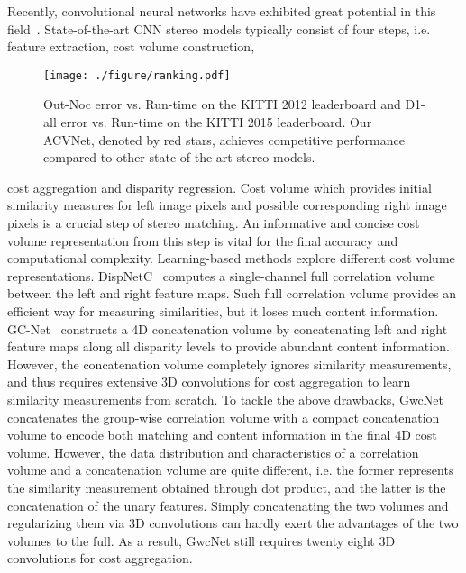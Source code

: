 \documentclass[10pt,twocolumn,letterpaper]{article}
\begin{document}
Recently, convolutional neural networks have exhibited great potential in this field~\cite{dispNetC2016large, chang2018pyramid, guo2019group, xu2020aanet}. State-of-the-art CNN stereo models typically consist of four steps, i.e. feature extraction, cost volume construction, 
\begin{figure}[t]
\centering
{\texttt{[image: ./figure/ranking.pdf]}}
\vspace{-15pt}
\caption{
Out-Noc error vs. Run-time on the KITTI 2012 leaderboard and D1-all error vs. Run-time on the KITTI 2015 leaderboard. Our ACVNet, denoted by red stars, achieves competitive performance compared to other 
state-of-the-art stereo models.}\label{fig:ranking}
\vspace{-15pt}
\end{figure}
cost aggregation and disparity regression. Cost volume which provides initial similarity measures for left image pixels and possible corresponding right image pixels is a crucial step of stereo matching. An informative and concise cost volume representation from this step is vital for the final accuracy and computational complexity. Learning-based methods explore different cost volume representations. 
DispNetC~\cite{dispNetC2016large} computes a single-channel full correlation volume between the left and right feature maps. Such full correlation volume provides an efficient way for measuring similarities, but it loses much content information.
GC-Net~\cite{kendall2017end}
constructs a 4D concatenation volume by concatenating left and right feature maps along all disparity levels to provide abundant content information. However, the concatenation volume completely ignores similarity measurements, and thus requires extensive 3D convolutions for cost aggregation to learn similarity measurements from scratch. To tackle the above drawbacks, 
GwcNet~\cite{guo2019group} concatenates the group-wise correlation volume with a compact concatenation volume to encode both matching and content information in the final 4D cost volume. However, the data distribution and characteristics of a correlation volume and a concatenation volume are quite different, i.e. the former represents the similarity measurement obtained through dot product, and the latter is the concatenation of the unary features. Simply concatenating the two volumes and regularizing them via 3D convolutions can hardly exert the advantages of the two volumes to the full. As a result, GwcNet still requires twenty eight 3D convolutions for cost aggregation.
\end{document}
